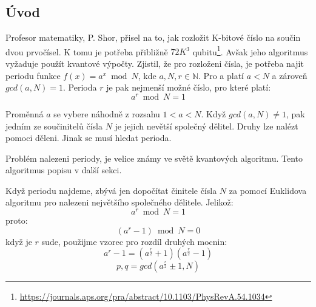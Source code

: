 \documentclass[11pt]{article}
\begin{document}
\subsection{Úvod}
Profesor matematiky, P. Shor, přisel na to, jak rozložit K-bitové číslo na součin dvou prvočísel.
K tomu je potřeba přibližně $72K^3$ qubitu\footnote{\url{https://journals.aps.org/pra/abstract/10.1103/PhysRevA.54.1034}}.
Avšak jeho algoritmus vyžaduje použít kvantové výpočty. Zjistil, že pro rozloženi čísla,
je potřeba najit periodu funkce $f(x) = a^x \bmod N$, kde $a, N, r \in \mathbb{N}$.
Pro a platí $a < N$ a zároveň $gcd(a, N) = 1$.
Perioda $r$ je pak nejmenší možné číslo, pro které platí:
$$a^r \bmod N = 1$$
\par Proměnná $a$ se vybere náhodně z rozsahu $1 < a < N$.
Když $gcd(a, N) \ne 1$, pak jedním ze součinitelů čísla $N$ je jejich nevětší společný dělitel.
Druhy lze nalézt pomoci děleni. Jinak se musí hledat perioda.
\par Problém nalezeni periody, je velice známy ve světě kvantových algoritmu. Tento algoritmus popisu v další sekci.
\par Když periodu najdeme, zbývá jen dopočítat činitele čísla $N$ za pomocí Euklidova algoritmu pro nalezeni největšího společného dělitele.
Jelikož:
$$a^r \bmod N = 1$$
proto:
$$(a^r - 1) \bmod N = 0$$
když je $r$ sude, použijme vzorec pro rozdíl druhých mocnin:
$$a^r - 1 = (a^\frac{r}{2} + 1)(a^\frac{r}{2} - 1)$$
$$p, q = gcd(a^\frac{r}{2} \pm 1, N)$$
\end{document}
